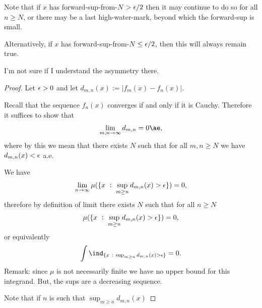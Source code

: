 \begin{remark}
  Note that if $x$ has forward-sup-from-$N$ $> \epsilon/2$ then it may continue to do so for all $n \geq N$, or
  there may be a last high-water-mark, beyond which the forward-sup is small.

  Alternatively, if $x$ has forward-sup-from-$N$ $\leq \epsilon/2$, then this will always remain true.

  I'm not sure if I understand the asymmetry there.
\end{remark}

\begin{proof}
  Let $\epsilon > 0$ and let $d_{m, n}(x) := |f_m(x) - f_n(x)|$.

  Recall that the sequence $f_n(x)$ converges if and only if it is Cauchy. Therefore it suffices to show that
  \begin{align*}
    \lim_{m, n \to \infty} d_{m, n} = 0 \ae,
  \end{align*}
  where by this we mean that there exists $N$ such that for all $m, n \geq N$ we have $d_{m, n}(x) < \epsilon$ a.e.

  We have
  \begin{align*}
    \limn \mu(\{x ~:~ \sup_{m \geq n} d_{m, n}(x) > \eps\}) = 0,
  \end{align*}
  therefore by definition of limit there exists $N$ such that for all $n \geq N$
  \begin{align*}
    \mu(\{x ~:~ \sup_{m \geq n} d_{m, n}(x) > \epsilon\}) = 0,
  \end{align*}
  or equivalently
  \begin{align*}
    \int \ind_{\{x ~:~ \sup_{m \geq n} d_{m, n}(x) > \eps\}} = 0.
  \end{align*}
  Remark: since $\mu$ is not necessarily finite we have no upper bound for this integrand. But, the sups are a decreasing sequence.

  Note that if $n$ is such that $\sup_{m \geq n} d_{m, n}(x)$

\end{proof}